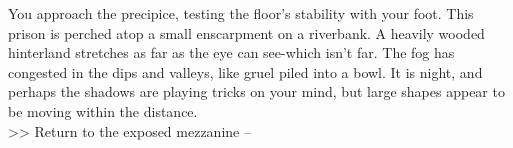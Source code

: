 You approach the precipice, testing the floor’s stability with your foot. This prison is perched atop a small enscarpment on a riverbank. A heavily wooded hinterland stretches as far as the eye can see-which isn’t far. The fog has congested in the dips and valleys, like gruel piled into a bowl. It is night, and perhaps the shadows are playing tricks on your mind, but large shapes appear to be moving within the distance.\\

>> Return to the exposed mezzanine -- 
